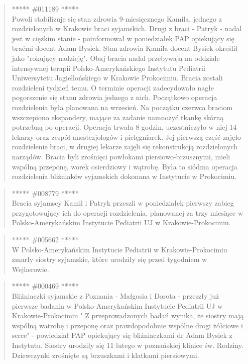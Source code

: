 \documentclass[11pt,a4paper]{article}
\begin{document}
\begin{quote} ***** \#011189 *****\\ Powoli stabilizuje się stan zdrowia
9-miesięcznego Kamila, jednego z rozdzielonych w Krakowie braci syjamskich.
Drugi z braci - Patryk - nadal jest w ciężkim stanie - poinformował w
poniedziałek PAP opiekujący się braćmi docent Adam Bysiek.  Stan zdrowia Kamila
docent Bysiek określił jako "rokujący nadzieję". Obaj bracia nadal przebywają
na oddziale intensywnej terapii Polsko-Amerykańskiego Instytutu Pediatrii
Uniwersytetu Jagiellońskiego w Krakowie Prokocimiu.  Bracia zostali rozdzieleni
tydzień temu. O terminie operacji zadecydowało nagłe pogorszenie się stanu
zdrowia jednego z nich.  Początkowo operacja rozdzielenia była planowana na
wrzesień. Na początku czerwca braciom wszczepiono ekspandery, mające za zadanie
namnożyć tkankę skórną potrzebną po operacji.  Operacja trwała 8 godzin,
uczestniczyło w niej 14 lekarzy oraz zespół anestezjologów i pielęgniarek. Jej
pierwszą część zajęło rozdzielenie braci, w drugiej lekarze zajęli się
rekonstrukcją rozdzielonych narządów. Bracia byli zrośnięci powłokami
piersiowo-brzusznymi, mieli wspólną przeponę, worek osierdziowy i wątrobę.
Była to siódma operacja rozdzielenia bliźniaków syjamskich dokonana w
Instytucie w Prokocimiu.  \end{quote}

\begin{quote} ***** \#008779 *****\\ Bracia syjamscy Kamil i Patryk przeszli w
poniedziałek pierwszy zabieg przygotowujący ich do operacji rozdzielenia,
planowanej za trzy miesiące w Polsko-Amerykańskim  Instytucie Pediatrii UJ w
Krakowie-Prokocimiu.  \end{quote}

\begin{quote} ***** \#005662 *****\\ W Polsko-Amerykańskim Instytucie Pediatrii w
Krakowie-Prokocimiu zmarły siostry syjamskie, które urodziły się przed
tygodniem w Wejherowie.  \end{quote}

\begin{quote} ***** \#000469 *****\\ Bliźniaczki syjamskie z Poznania - Małgosia i
Dorota - przeszły już pierwsze badania w Polsko-Amerykańskim Instytucie
Pediatrii UJ w Krakowie-Prokocimiu." Z przeprowadzonych badań wynika, że
siostry mają wspólną watrobę i przeponę oraz prawdopodobnie wspólne drogi
żółciowe i serce" - powiedział PAP opiekujący się bliźniaczkami dr Adam Bysiek
z Instytutu. Siostry urodziły się 11 lutego w poznańskiej klinice św. Rodziny.
Dziewczynki zrośnięte są brzuszkami i klatkami piersiowymi.  \end{quote}
\end{document}
